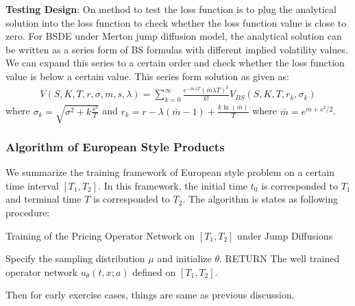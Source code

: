 \documentclass[11pt,a4paper]{article}
\theoremstyle{remark}
\begin{document}
	\noindent \textbf{Testing Design}: On method to test the loss function is to plug the analytical solution into the loss function to check whether the loss function value is close to zero. For BSDE under Merton jump diffusion model, the analytical solution can be written as a series form of BS formulas with different implied volatility values. We can expand this series to a certain order and check whether the loss function value is below a certain value. This series form solution as given as:
	\begin{align}
		V(S, K, T, r, \sigma, m, s, \lambda)=\sum_{k=0}^{\infty} \frac{e ^{-\bar{m} \lambda T}(\bar{m} \lambda T)^{k}}{k !} V_{B S}\left(S, K, T, r_{k}, \sigma_{k}\right)
	\end{align}
	where $\sigma_{k}=\sqrt{\sigma^{2}+k \frac{s^{2}}{T}}$ and $r_{k}=r-\lambda(\bar{m}-1)+\frac{k \ln (\bar{m})}{T}$ where $\bar{m} = e^{m + s^2/2}$. 

\subsubsection{Algorithm of European Style Products} \label{sec:euro_jump}
We summarize the training framework of European style problem on a certain time interval $[T_1, T_2]$. In this framework, the initial time $t_0$ is corresponded to $T_1$ and terminal time $T$ is corresponded to $T_2$. The algorithm is states as following procedure:

\begin{algorithm} [htbp!]
	\begin{algorithmic}[htbp!] 
		\caption{Training of the Pricing Operator Network on $[T_1, T_2]$ under Jump Diffusions}\label{alg:euro_algo_jump}
		\STATE Specify the sampling distribution $\mu$ and initialize $\theta$.
		\ENDFOR
		\RETURN  RETURN The well trained operator network $u_{\theta}(t, x; a)$ defined on $[T_1, T_2]$.
	\end{algorithmic}
\end{algorithm}
\noindent Then for early exercise cases, things are same as previous discussion.
\end{document}
